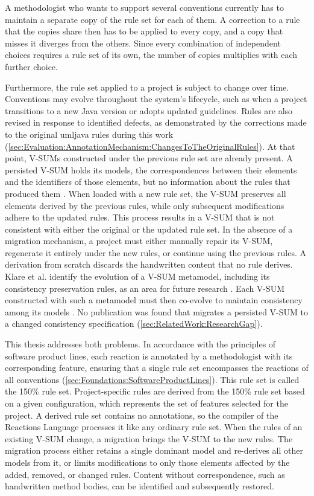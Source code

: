 A methodologist who wants to support several conventions currently has to maintain a separate copy of the rule set for each of them.
A correction to a rule that the copies share then has to be applied to every copy, and a copy that misses it diverges from the others.
Since every combination of independent choices requires a rule set of its own, the number of copies multiplies with each further choice.

Furthermore, the rule set applied to a project is subject to change over time.
Conventions may evolve throughout the system's lifecycle, such as when a project transitions to a new Java version or adopts updated guidelines.
Rules are also revised in response to identified defects, as demonstrated by the corrections made to the original umljava rules during this work (\autoref{sec:Evaluation:AnnotationMechanism:ChangesToTheOriginalRules}).
At that point, V-SUMs constructed under the previous rule set are already present.
A persisted V-SUM holds its models, the correspondences between their elements and the identifiers of those elements, but no information about the rules that produced them \cite{vitruviusGithub}.
When loaded with a new rule set, the V-SUM preserves all elements derived by the previous rules, while only subsequent modifications adhere to the updated rules.
This process results in a V-SUM that is not consistent with either the original or the updated rule set.
In the absence of a migration mechanism, a project must either manually repair its V-SUM, regenerate it entirely under the new rules, or continue using the previous rules.
A derivation from scratch discards the handwritten content that no rule derives.
Klare et al. identify the evolution of a V-SUM metamodel, including its consistency preservation rules, as an area for future research \cite{KLARE2021110815}.
Each V-SUM constructed with such a metamodel must then co-evolve to maintain consistency among its models \cite{KLARE2021110815}.
No publication was found that migrates a persisted V-SUM to a changed consistency specification (\autoref{sec:RelatedWork:ResearchGap}).

This thesis addresses both problems.
In accordance with the principles of software product lines, each reaction is annotated by a methodologist with its corresponding feature, ensuring that a single rule set encompasses the reactions of all conventions (\autoref{sec:Foundations:SoftwareProductLines}).
This rule set is called the 150\% rule set.
Project-specific rules are derived from the 150\% rule set based on a given configuration, which represents the set of features selected for the project.
A derived rule set contains no annotations, so the compiler of the Reactions Language processes it like any ordinary rule set.
When the rules of an existing V-SUM change, a migration brings the V-SUM to the new rules.
The migration process either retains a single dominant model and re-derives all other models from it, or limits modifications to only those elements affected by the added, removed, or changed rules.
Content without correspondence, such as handwritten method bodies, can be identified and subsequently restored.

